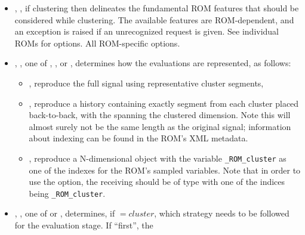 {\begin{itemize}
        defined in the  block to this segmentation. If clustering is enabled (see
         above), then this associated Classifier will be used to cluster the segmented ROM
        subspaces. The attributes = and
        = must be set, and the text of this node is the 
        of the requested Classifier. Note this Classifier must be a valid Classifier; not all PostProcessors
        are suitable. For example, see the DataMining PostProcessor subtype Clustering.
      \item {}, , if clustering then delineates
        the fundamental ROM features that should be considered while clustering. The available features are
        ROM-dependent, and an exception is raised if an unrecognized request is given. See individual ROMs
        for options.  All ROM-specific options.
      \item {}, , one of ,
        , or , determines how the evaluations are
        represented, as follows:
        \begin{itemize}
          \item {}, reproduce the full signal using representative cluster segments,
          \item {}, reproduce a history containing exactly segment from each
            cluster placed back-to-back, with the  spanning the clustered
            dimension. Note this will almost surely not be the same length as the original signal;
            information about indexing can be found in the ROM's XML metadata.
          \item {}, reproduce a N-dimensional object with the variable
            \texttt{\_ROM\_cluster} as one of the indexes for the ROM's sampled variables. Note that
            in order to use the option, the receiving  should be of type
             with one of the indices being \texttt{\_ROM\_cluster}.
        \end{itemize}
     \item {}, , one of  or
        , determines, if $=cluster$, which
        strategy needs to be followed for the evaluation stage. If ``first'', the

\end{itemize}}
